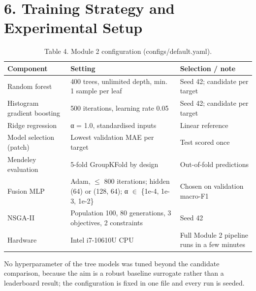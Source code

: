 \documentclass[11pt,a4paper]{article}
\begin{document}
\section*{6. Training Strategy and Experimental Setup}
\begin{table}[H]\centering\small
\caption*{Table 4. Module 2 configuration (configs/default.yaml).}
\begin{tabularx}{\linewidth}{XXX}
\toprule
\textbf{Component} & \textbf{Setting} & \textbf{Selection / note} \\
\midrule
Random forest & 400 trees, unlimited depth, min. 1 sample per leaf & Seed 42; candidate per target \\
Histogram gradient boosting & 500 iterations, learning rate 0.05 & Seed 42; candidate per target \\
Ridge regression & α = 1.0, standardised inputs & Linear reference \\
Model selection (patch) & Lowest validation MAE per target & Test scored once \\
Mendeley evaluation & 5-fold GroupKFold by design & Out-of-fold predictions \\
Fusion MLP & Adam, $\leq$ 800 iterations; hidden (64) or (128, 64); α $\in$ \{1e-4, 1e-3, 1e-2\} & Chosen on validation macro-F1 \\
NSGA-II & Population 100, 80 generations, 3 objectives, 2 constraints & Seed 42 \\
Hardware & Intel i7-10610U CPU & Full Module 2 pipeline runs in a few minutes \\
\bottomrule
\end{tabularx}
\end{table}
No hyperparameter of the tree models was tuned beyond the candidate comparison, because the aim is a robust baseline surrogate rather than a leaderboard result; the configuration is fixed in one file and every run is seeded.
\end{document}
